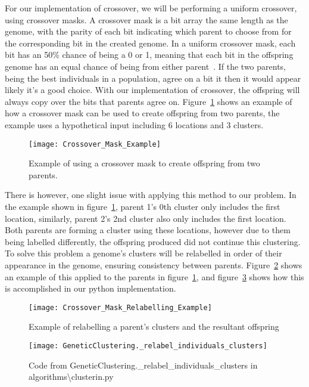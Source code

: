 \noindent
For our implementation of crossover, we will be performing a uniform crossover, using crossover masks.
A crossover mask is a bit array the same length as the genome, with the parity of each bit indicating which parent
to choose from for the corresponding bit in the created genome.
In a uniform crossover mask, each bit has an 50\% chance of being a 0 or 1, meaning that each bit in the offspring
genome has an equal chance of being from either parent~\parencite{syswerda1989uniform}.
If the two parents, being the best individuals in a population, agree on a bit it then it would appear likely it's a
good choice.
With our implementation of crossover, the offspring will always copy over the bits that parents agree on.
Figure~\ref{fig:Crossover_Mask_Example} shows an example of how a crossover mask can be used to create offspring from
two parents, the example uses a hypothetical input including 6 locations and 3 clusters.
\begin{figure}[H]
    \centering
    \texttt{[image: Crossover\_Mask\_Example]}
    \caption{Example of using a crossover mask to create offspring from two parents.}
    \label{fig:Crossover_Mask_Example}
\end{figure}

\noindent
There is however, one slight issue with applying this method to our problem.
In the example shown in figure~\ref{fig:Crossover_Mask_Example}, parent 1's 0th cluster only includes the first
location, similarly, parent 2's 2nd cluster also only includes the first location.
Both parents are forming a cluster using these locations, however due to them being labelled differently, the
offspring produced did not continue this clustering.
To solve this problem a genome's clusters will be relabelled in order of their appearance in the genome, ensuring
consistency between parents.
Figure~\ref{fig:Crossover_Mask_Relabelling_Example} shows an example of this applied to the parents in figure~\ref{fig:Crossover_Mask_Example},
and figure~\ref{fig:GeneticClustering._relabel_individuals_clusters} shows how this is accomplished in our python
implementation.
\begin{figure}[H]
    \centering
    \texttt{[image: Crossover\_Mask\_Relabelling\_Example]}
    \caption{Example of relabelling a parent's clusters and the resultant offspring}
    \label{fig:Crossover_Mask_Relabelling_Example}
\end{figure}
\begin{figure}[H]
    \centering
    \texttt{[image: GeneticClustering.\_relabel\_individuals\_clusters]}
    \caption{Code from GeneticClustering.\_relabel\_individuals\_clusters in algorithms\textbackslash clusterin.py}
    \label{fig:GeneticClustering._relabel_individuals_clusters}
\end{figure}

